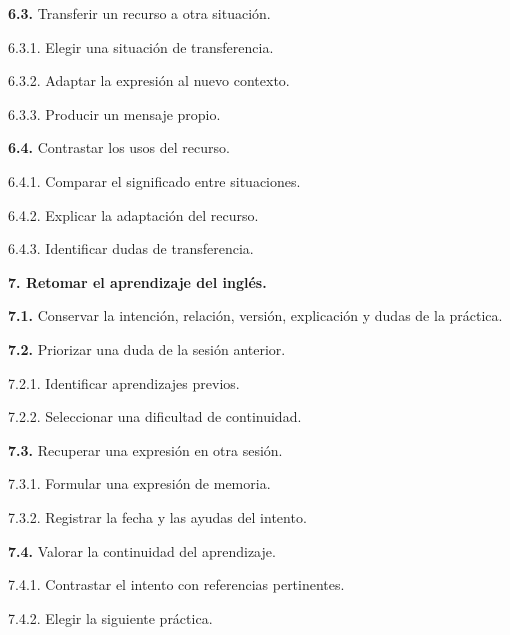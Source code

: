 \documentclass[10pt,a4paper]{article}
\newcommand{\HTAline}[3]{\par\noindent\hspace*{#1cm}\begin{minipage}{\dimexpr\linewidth-#1cm\relax}#3 #2\end{minipage}\par}
\begin{document}
\HTAline{0.4}{\textbf{6.3.} Transferir un recurso a otra situación.}{}
\HTAline{0.8}{6.3.1. Elegir una situación de transferencia.}{}
\HTAline{0.8}{6.3.2. Adaptar la expresión al nuevo contexto.}{}
\HTAline{0.8}{6.3.3. Producir un mensaje propio.}{}
\HTAline{0.4}{\textbf{6.4.} Contrastar los usos del recurso.}{}
\HTAline{0.8}{6.4.1. Comparar el significado entre situaciones.}{}
\HTAline{0.8}{6.4.2. Explicar la adaptación del recurso.}{}
\HTAline{0.8}{6.4.3. Identificar dudas de transferencia.}{}
\HTAline{0.0}{\textbf{7. Retomar el aprendizaje del inglés.}}{}
\HTAline{0.4}{\textbf{7.1.} Conservar la intención, relación, versión, explicación y dudas de la práctica.}{}
\HTAline{0.4}{\textbf{7.2.} Priorizar una duda de la sesión anterior.}{}
\HTAline{0.8}{7.2.1. Identificar aprendizajes previos.}{}
\HTAline{0.8}{7.2.2. Seleccionar una dificultad de continuidad.}{}
\HTAline{0.4}{\textbf{7.3.} Recuperar una expresión en otra sesión.}{}
\HTAline{0.8}{7.3.1. Formular una expresión de memoria.}{}
\HTAline{0.8}{7.3.2. Registrar la fecha y las ayudas del intento.}{}
\HTAline{0.4}{\textbf{7.4.} Valorar la continuidad del aprendizaje.}{}
\HTAline{0.8}{7.4.1. Contrastar el intento con referencias pertinentes.}{}
\HTAline{0.8}{7.4.2. Elegir la siguiente práctica.}{}
\end{document}
